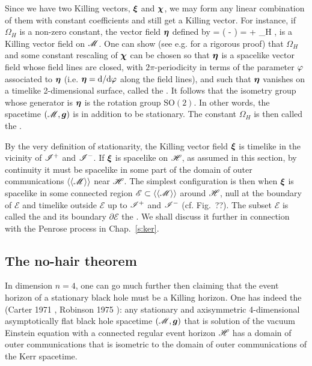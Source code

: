 Since we have two Killing vectors, $\bm{\xi}$ and $\bm{\chi}$, we may
form any linear combination of them with constant coefficients
and still get a Killing vector. For instance, if $\Omega_H$ is a non-zero constant,
the vector field $\bm{\eta}$ defined by
\be
    \w{\eta} =  \left( \w{\chi} - \w{\xi} \right)
    \quad\iff\quad
    \w{\chi} = \w{\xi} + \Omega_H \w{\eta} ,
\ee
is a Killing vector field on $\mathscr{M}$.
One can show (see e.g. \cite{Chrus97} for a rigorous proof) that $\Omega_H$
and some constant rescaling of $\bm{\chi}$
can be chosen so that $\bm{\eta}$ is a spacelike vector field whose
field lines are closed, with $2\pi$-periodicity in terms of the parameter $\varphi$
associated to $\bm{\eta}$ (i.e. $\bm{\eta} = \mathrm{d}/\mathrm{d}\varphi$ along the field lines),
and such that $\bm{\eta}$ vanishes on a timelike 2-dimensional surface, called
the .
It follows that
the isometry group whose generator is $\bm{\eta}$ is the rotation group
$\mathrm{SO}(2)$. In other words, the spacetime $(\mathscr{M},\bm{g})$ is
 in addition to be stationary.
The constant $\Omega_H$ is then called the
.

By the very definition of stationarity, the Killing vector field $\bm{\xi}$ is
timelike in the vicinity of $\mathscr{I}^+$ and $\mathscr{I}^-$. If $\bm{\xi}$ is spacelike
on $\mathscr{H}$, as assumed in this section, by continuity it must be spacelike
in some part of the domain of outer communications $\langle\langle \mathscr{M}\rangle\rangle$
near $\mathscr{H}$. The simplest configuration is then when
$\bm{\xi}$ is spacelike in some connected region $\mathscr{E}\subset \langle\langle \mathscr{M}\rangle\rangle$
around $\mathscr{H}$, null at the boundary of $\mathscr{E}$ and timelike outside $\mathscr{E}$
up to $\mathscr{I}^+$ and $\mathscr{I}^-$ (cf. Fig.~??). The subset $\mathscr{E}$ is
called the  and its boundary $\partial\mathscr{E}$
the . We shall discuss it further in connection with
the Penrose process in Chap.~\ref{s:ker}.


\subsection{The no-hair theorem}

In dimension $n=4$, one can go much further then claiming that the
event horizon of a stationary black hole must be a Killing horizon.
One has indeed the 
(Carter 1971 \cite{Carte71}, Robinson 1975 \cite{Robin75}):
any stationary and axisymmetric 4-dimensional asymptotically flat
black hole spacetime $(\mathscr{M},\bm{g})$ that is
solution of the vacuum Einstein equation with a connected regular
event horizon $\mathscr{H}$ has a domain of outer communications that is isometric
to the domain of outer communications of the Kerr spacetime.

